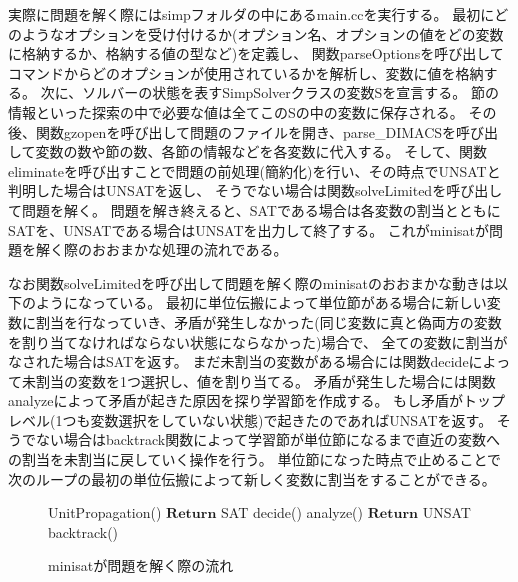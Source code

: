 \documentclass[titlepage]{jsarticle}
\begin{document}
実際に問題を解く際にはsimpフォルダの中にあるmain.ccを実行する。
最初にどのようなオプションを受け付けるか(オプション名、オプションの値をどの変数に格納するか、格納する値の型など)を定義し、
関数parseOptionsを呼び出してコマンドからどのオプションが使用されているかを解析し、変数に値を格納する。
次に、ソルバーの状態を表すSimpSolverクラスの変数Sを宣言する。
節の情報といった探索の中で必要な値は全てこのSの中の変数に保存される。
その後、関数gzopenを呼び出して問題のファイルを開き、parse\_DIMACSを呼び出して変数の数や節の数、各節の情報などを各変数に代入する。
そして、関数eliminateを呼び出すことで問題の前処理(簡約化)を行い、その時点でUNSATと判明した場合はUNSATを返し、
そうでない場合は関数solveLimitedを呼び出して問題を解く。
問題を解き終えると、SATである場合は各変数の割当とともにSATを、UNSATである場合はUNSATを出力して終了する。
これがminisatが問題を解く際のおおまかな処理の流れである。

なお関数solveLimitedを呼び出して問題を解く際のminisatのおおまかな動きは以下のようになっている。
最初に単位伝搬によって単位節がある場合に新しい変数に割当を行なっていき、矛盾が発生しなかった(同じ変数に真と偽両方の変数を割り当てなければならない状態にならなかった)場合で、
全ての変数に割当がなされた場合はSATを返す。
まだ未割当の変数がある場合には関数decideによって未割当の変数を1つ選択し、値を割り当てる。
矛盾が発生した場合には関数analyzeによって矛盾が起きた原因を探り学習節を作成する。
もし矛盾がトップレベル(1つも変数選択をしていない状態)で起きたのであればUNSATを返す。
そうでない場合はbacktrack関数によって学習節が単位節になるまで直近の変数への割当を未割当に戻していく操作を行う。
単位節になった時点で止めることで次のループの最初の単位伝搬によって新しく変数に割当をすることができる。

\begin{figure}[!t]
\begin{algorithm}[H]
	\begin{algorithmic}[1]
			\State UnitPropagation()
					\State $\mathbf{Return}$ SAT
				\Else
					\State decide()
				\EndIf
			\Else
				\State analyze()
					\State $\mathbf{Return}$ UNSAT
				\Else
					\State backtrack()
				\EndIf
			\EndIf
		\EndWhile
	\end{algorithmic}
\end{algorithm}
\caption{minisatが問題を解く際の流れ}
\end{figure}
\end{document}
